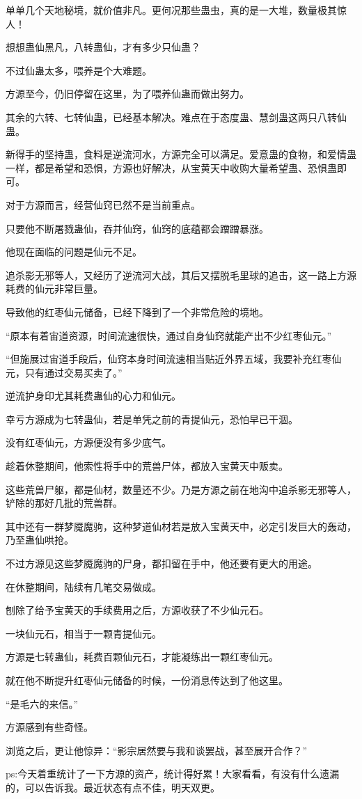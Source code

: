 \begin{this_body}
单单几个天地秘境，就价值非凡。更何况那些蛊虫，真的是一大堆，数量极其惊人！

想想蛊仙黑凡，八转蛊仙，才有多少只仙蛊？

不过仙蛊太多，喂养是个大难题。

方源至今，仍旧停留在这里，为了喂养仙蛊而做出努力。

其余的六转、七转仙蛊，已经基本解决。难点在于态度蛊、慧剑蛊这两只八转仙蛊。

新得手的坚持蛊，食料是逆流河水，方源完全可以满足。爱意蛊的食物，和爱情蛊一样，都是希望和恐惧，方源也好解决，从宝黄天中收购大量希望蛊、恐惧蛊即可。

对于方源而言，经营仙窍已然不是当前重点。

只要他不断屠戮蛊仙，吞并仙窍，仙窍的底蕴都会蹭蹭暴涨。

他现在面临的问题是仙元不足。

追杀影无邪等人，又经历了逆流河大战，其后又摆脱毛里球的追击，这一路上方源耗费的仙元非常巨量。

导致他的红枣仙元储备，已经下降到了一个非常危险的境地。

“原本有着宙道资源，时间流速很快，通过自身仙窍就能产出不少红枣仙元。”

“但施展过宙道手段后，仙窍本身时间流速相当贴近外界五域，我要补充红枣仙元，只有通过交易买卖了。”

逆流护身印尤其耗费蛊仙的心力和仙元。

幸亏方源成为七转蛊仙，若是单凭之前的青提仙元，恐怕早已干涸。

没有红枣仙元，方源便没有多少底气。

趁着休整期间，他索性将手中的荒兽尸体，都放入宝黄天中贩卖。

这些荒兽尸躯，都是仙材，数量还不少。乃是方源之前在地沟中追杀影无邪等人，铲除的那好几批的荒兽群。

其中还有一群梦魇魔驹，这种梦道仙材若是放入宝黄天中，必定引发巨大的轰动，乃至蛊仙哄抢。

不过方源见这些梦魇魔驹的尸身，都扣留在手中，他还要有更大的用途。

在休整期间，陆续有几笔交易做成。

刨除了给予宝黄天的手续费用之后，方源收获了不少仙元石。

一块仙元石，相当于一颗青提仙元。

方源是七转蛊仙，耗费百颗仙元石，才能凝练出一颗红枣仙元。

就在他不断提升红枣仙元储备的时候，一份消息传达到了他这里。

“是毛六的来信。”

方源感到有些奇怪。

浏览之后，更让他惊异：“影宗居然要与我和谈罢战，甚至展开合作？”

ps:今天着重统计了一下方源的资产，统计得好累！大家看看，有没有什么遗漏的，可以告诉我。最近状态有点不佳，明天双更。

\end{this_body}

